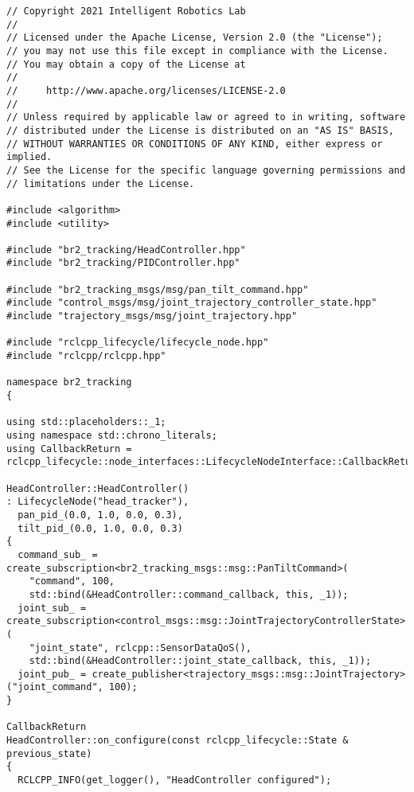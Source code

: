  \footnotesize
\begin{tcolorbox}[sharp corners, colframe=gray!80, colback=LightGray, left=0pt, top=0pt, bottom=0pt, title=\texttt{br2\_tracking/src/br2\_tracking/HeadController.cpp}]
  \begin{verbatim}
// Copyright 2021 Intelligent Robotics Lab
//
// Licensed under the Apache License, Version 2.0 (the "License");
// you may not use this file except in compliance with the License.
// You may obtain a copy of the License at
//
//     http://www.apache.org/licenses/LICENSE-2.0
//
// Unless required by applicable law or agreed to in writing, software
// distributed under the License is distributed on an "AS IS" BASIS,
// WITHOUT WARRANTIES OR CONDITIONS OF ANY KIND, either express or implied.
// See the License for the specific language governing permissions and
// limitations under the License.

#include <algorithm>
#include <utility>

#include "br2_tracking/HeadController.hpp"
#include "br2_tracking/PIDController.hpp"

#include "br2_tracking_msgs/msg/pan_tilt_command.hpp"
#include "control_msgs/msg/joint_trajectory_controller_state.hpp"
#include "trajectory_msgs/msg/joint_trajectory.hpp"

#include "rclcpp_lifecycle/lifecycle_node.hpp"
#include "rclcpp/rclcpp.hpp"

namespace br2_tracking
{

using std::placeholders::_1;
using namespace std::chrono_literals;
using CallbackReturn = rclcpp_lifecycle::node_interfaces::LifecycleNodeInterface::CallbackReturn;

HeadController::HeadController()
: LifecycleNode("head_tracker"),
  pan_pid_(0.0, 1.0, 0.0, 0.3),
  tilt_pid_(0.0, 1.0, 0.0, 0.3)
{
  command_sub_ = create_subscription<br2_tracking_msgs::msg::PanTiltCommand>(
    "command", 100,
    std::bind(&HeadController::command_callback, this, _1));
  joint_sub_ = create_subscription<control_msgs::msg::JointTrajectoryControllerState>(
    "joint_state", rclcpp::SensorDataQoS(),
    std::bind(&HeadController::joint_state_callback, this, _1));
  joint_pub_ = create_publisher<trajectory_msgs::msg::JointTrajectory>("joint_command", 100);
}

CallbackReturn
HeadController::on_configure(const rclcpp_lifecycle::State & previous_state)
{
  RCLCPP_INFO(get_logger(), "HeadController configured");


\end{verbatim}
\end{tcolorbox}
